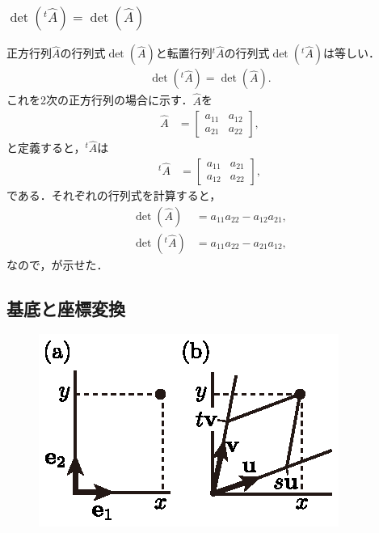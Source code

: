 \subsubsection{$\det({}^{t}\hat{A})=\det(\hat{A})$}
%
正方行列$\hat{A}$の行列式$\det(\hat{A})$と転置行列${}^{t}\hat{A}$の行列式$\det({}^{t}\hat{A})$は等しい．
%
\begin{align}
\det({}^{t}\hat{A})=\det(\hat{A}). \label{LA:det(tA)=det(A)_2D}
\end{align}
%
これを2次の正方行列の場合に示す．$\hat{A}$を
%
\begin{align}
\hat{A} & =\left[\begin{array}{cc}
a_{11} & a_{12}\\
a_{21} & a_{22}
\end{array}\right], 
\end{align}
%
と定義すると，${}^{t}\hat{A}$は
%
\begin{align}
{}^{t}\hat{A} & =\left[\begin{array}{cc}
a_{11} & a_{21}\\
a_{12} & a_{22}
\end{array}\right], 
\end{align}
%
である．それぞれの行列式を計算すると，
\begin{align}
\det(\hat{A}) & =a_{11}a_{22}-a_{12}a_{21},\\
\det({}^{t}\hat{A}) & =a_{11}a_{22}-a_{21}a_{12},
\end{align}
%
なので，が示せた．
%
\subsection{基底と座標変換}
%
\begin{figure}
  \centering
  \includegraphics[width=1.0\linewidth]{figures/la_basis_e1e2.eps} 
\end{figure}

